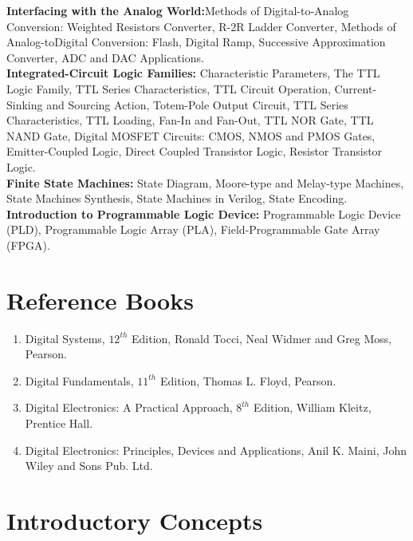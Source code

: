 \documentclass[a4aper,12pt]{report}
\begin{document}
   \textbf{Interfacing with the Analog World:}Methods of Digital-to-Analog Conversion: Weighted Resistors Converter, R-2R Ladder Converter, Methods of Analog-toDigital Conversion: Flash, Digital Ramp, Successive Approximation Converter, ADC and DAC Applications. \\ [5pt]
   \textbf{Integrated-Circuit Logic Families:} Characteristic Parameters, The TTL Logic Family, TTL Series Characteristics, TTL Circuit Operation, Current-Sinking and Sourcing Action, Totem-Pole Output Circuit, TTL Series Characteristics, TTL Loading, Fan-In and Fan-Out, TTL NOR Gate, TTL NAND Gate, Digital MOSFET Circuits: CMOS, NMOS and PMOS Gates, Emitter-Coupled Logic, Direct Coupled Transistor Logic, Resistor Transistor Logic. \\ [5pt]
   \textbf{Finite State Machines: }State Diagram, Moore-type and Melay-type Machines, State Machines Synthesis, State Machines in Verilog, State Encoding. \\ [5pt]
   \textbf{Introduction to Programmable Logic Device:} Programmable Logic Device (PLD), Programmable Logic Array (PLA), Field-Programmable Gate Array (FPGA).
   
\newpage
\chapter*{Reference Books}
\vspace*{-2.7cm}
\thispagestyle{empty}
\begin{enumerate}
    \item Digital Systems, $12^{th}$ Edition, Ronald Tocci, Neal Widmer and Greg Moss, Pearson. 
    \item Digital Fundamentals, $11^{th}$ Edition, Thomas L. Floyd, Pearson. 
    \item Digital Electronics: A Practical Approach, $8^{th}$ Edition, William Kleitz, Prentice Hall.
    \item Digital Electronics: Principles, Devices and Applications, Anil K. Maini, John Wiley and Sons Pub. Ltd.
\end{enumerate}
\tableofcontents 
\thispagestyle{empty}
\newpage
\setcounter{page}{1}
\chapter{Introductory Concepts}
\vspace*{-30pt}
\end{document}
